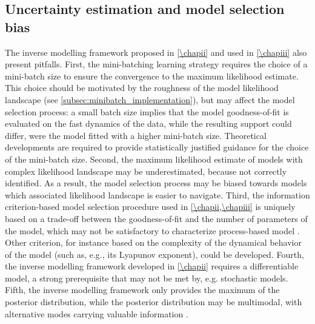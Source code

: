\subsection{Uncertainty estimation and model selection bias}
The inverse modelling framework proposed in \cref{\chapii} and used in \cref{\chapiii} also present pitfalls.
%
First, the mini-batching learning strategy requires the choice of a mini-batch size to ensure the convergence to the maximum likelihood estimate. This choice should be motivated by the roughness of the model likelihood landscape (see \cref{subsec:minibatch_implementation}), but may affect the model selection process:
% 
a small batch size implies that the model goodness-of-fit is evaluated on the fast dynamics of the data, while the resulting support could differ, were the model fitted with a higher mini-batch size. Theoretical developments are required to provide statistically justified guidance for the choice of the mini-batch size. 
% 
Second, the maximum likelihood estimate of models with complex likelihood landscape may be underestimated, because not correctly identified. As a result, the model selection process may be biased towards models which associated likelihood landscape is easier to navigate. 
% 
Third, the information criterion-based model selection procedure used in \cref{\chapii,\chapiii} is uniquely based on a trade-off between the goodness-of-fit and the number of parameters of the model, which may not be satisfactory to characterize process-based model \citep{Clermont2015}. 
% 
Other criterion, for instance based on the complexity of the dynamical behavior of the model (such as, e.g., its Lyapunov exponent), could be developed.
% 
Fourth, the inverse modelling framework developed in \cref{\chapii} requires a differentiable model, a strong prerequisite that may not be met by, e.g. stochastic models. 
% 
Fifth, the inverse modelling framework only provides the maximum of the posterior distribution, while the posterior distribution may be multimodal, with alternative modes carrying valuable information \citep{Wilson2020}.%

